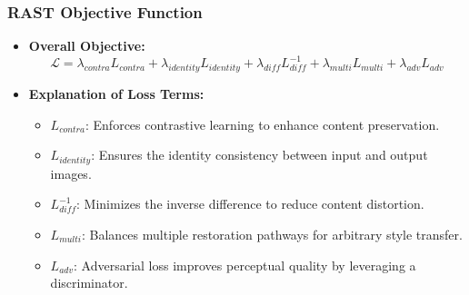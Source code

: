\begin{frame}
\frametitle{RAST Objective Function}

\begin{itemize}
    \item \textbf{Overall Objective:}
    \[
        \mathcal{L} = \lambda_{contra} L_{contra} + \lambda_{identity} L_{identity} + \lambda_{diff} L^{-1}_{diff} + \lambda_{multi} L_{multi} + \lambda_{adv} L_{adv}
    \]
    \item \textbf{Explanation of Loss Terms:}
    \begin{itemize}
        \item $L_{contra}$: Enforces contrastive learning to enhance content preservation.
        \item $L_{identity}$: Ensures the identity consistency between input and output images.
        \item $L^{-1}_{diff}$: Minimizes the inverse difference to reduce content distortion.
        \item $L_{multi}$: Balances multiple restoration pathways for arbitrary style transfer.
        \item $L_{adv}$: Adversarial loss improves perceptual quality by leveraging a discriminator.
    \end{itemize}
\end{itemize}

\end{frame}